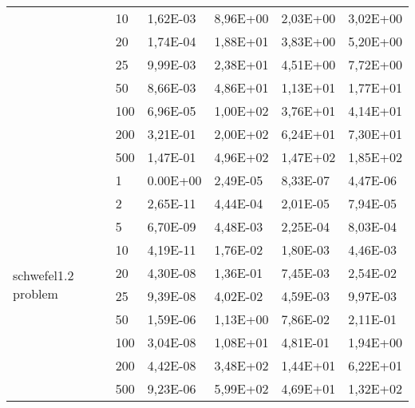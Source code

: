 \begin{longtable}[c]{|m{3.5cm}|l|l|l|l|l|}
                                        & 10        & 1,62E-03   & 8,96E+00   & 2,03E+00   & 3,02E+00  \\ \cline{2-6} 
                                        & 20        & 1,74E-04   & 1,88E+01   & 3,83E+00   & 5,20E+00  \\ \cline{2-6} 
                                        & 25        & 9,99E-03   & 2,38E+01   & 4,51E+00   & 7,72E+00  \\ \cline{2-6} 
                                        & 50        & 8,66E-03   & 4,86E+01   & 1,13E+01   & 1,77E+01  \\ \cline{2-6} 
                                        & 100       & 6,96E-05   & 1,00E+02   & 3,76E+01   & 4,14E+01  \\ \cline{2-6} 
                                        & 200       & 3,21E-01   & 2,00E+02   & 6,24E+01   & 7,30E+01  \\ \cline{2-6} 
                                        & 500       & 1,47E-01   & 4,96E+02   & 1,47E+02   & 1,85E+02  \\ \hline
\multirow{10}{*}{schwefel1.2 problem}   & 1         & 0.00E+00   & 2,49E-05   & 8,33E-07   & 4,47E-06  \\ \cline{2-6} 
                                        & 2         & 2,65E-11   & 4,44E-04   & 2,01E-05   & 7,94E-05  \\ \cline{2-6} 
                                        & 5         & 6,70E-09   & 4,48E-03   & 2,25E-04   & 8,03E-04  \\ \cline{2-6} 
                                        & 10        & 4,19E-11   & 1,76E-02   & 1,80E-03   & 4,46E-03  \\ \cline{2-6} 
                                        & 20        & 4,30E-08   & 1,36E-01   & 7,45E-03   & 2,54E-02  \\ \cline{2-6} 
                                        & 25        & 9,39E-08   & 4,02E-02   & 4,59E-03   & 9,97E-03  \\ \cline{2-6} 
                                        & 50        & 1,59E-06   & 1,13E+00   & 7,86E-02   & 2,11E-01  \\ \cline{2-6} 
                                        & 100       & 3,04E-08   & 1,08E+01   & 4,81E-01   & 1,94E+00  \\ \cline{2-6} 
                                        & 200       & 4,42E-08   & 3,48E+02   & 1,44E+01   & 6,22E+01  \\ \cline{2-6} 
                                        & 500       & 9,23E-06   & 5,99E+02   & 4,69E+01   & 1,32E+02  \\ \hline

\end{longtable}
